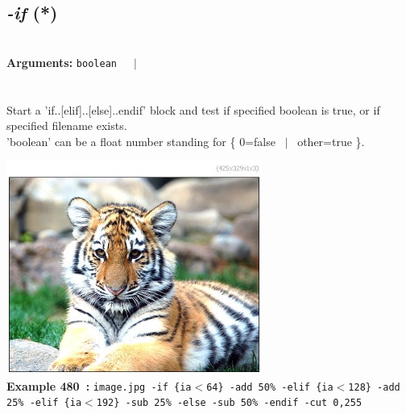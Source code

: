 \documentclass[a4paper,11pt,twoside]{book}
\begin{document}
\subsection{\emph{-if} (*)}\vspace*{-0.5em}
~\\\textbf{Arguments: } 
{\small \texttt{boolean}}~~~$|$\\
\\~\\
Start a 'if..[elif]..[else]..endif' block and test if specified boolean is true,
or if specified filename exists.
~\\'boolean' can be a float number standing for \{ 0=false ~$|$~ other=true \}.
\begin{center}\includegraphics[keepaspectratio=true,height=7cm,width=\textwidth]{img/gmic_def480.jpg}\\
{\footnotesize \textbf{Example 480~:} \texttt{image.jpg -if \{ia$<$64\} -add 50\% -elif \{ia$<$128\} -add 25\% -elif \{ia$<$192\} -sub 25\% -else -sub 50\% -endif -cut 0,255}}
\end{center}
\end{document}
